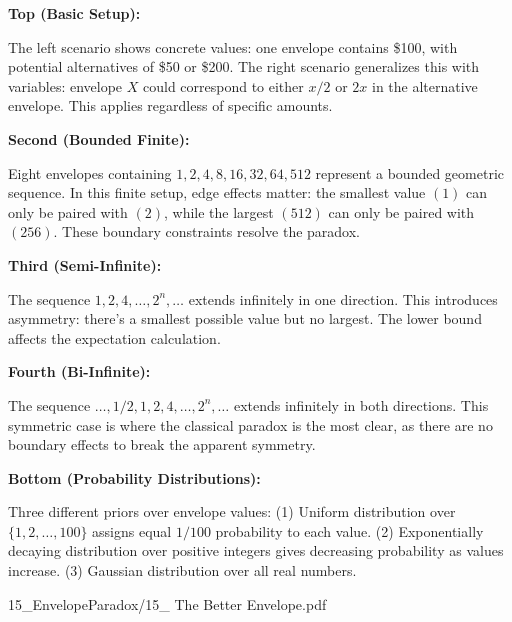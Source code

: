 \begin{SideNotePage}{
  \textbf{Top (Basic Setup):} \par The left scenario shows concrete values: one envelope contains \$100, with potential alternatives of \$50 or \$200. The right scenario generalizes this with variables: envelope $X$ could correspond to either $x/2$ or $2x$ in the alternative envelope. This applies regardless of specific amounts.

  \vspace{1em}
  \textbf{Second (Bounded Finite):} \par Eight envelopes containing $1, 2, 4, 8, 16, 32, 64, 512$ represent a bounded geometric sequence. In this finite setup, edge effects matter: the smallest value $(1)$ can only be paired with $(2)$, while the largest $(512)$ can only be paired with $(256)$. These boundary constraints resolve the paradox.

  \vspace{1em}
  \textbf{Third (Semi-Infinite):} \par The sequence $1, 2, 4, \ldots, 2^n, \ldots$ extends infinitely in one direction. This introduces asymmetry: there's a smallest possible value but no largest. The lower bound affects the expectation calculation.

  \vspace{1em}
  \textbf{Fourth (Bi-Infinite):} \par The sequence $\ldots, 1/2, 1, 2, 4, \ldots, 2^n, \ldots$ extends infinitely in both directions. This symmetric case is where the classical paradox is the most clear, as there are no boundary effects to break the apparent symmetry.

  \vspace{1em}
  \textbf{Bottom (Probability Distributions):} \par Three different priors over envelope values: (1) Uniform distribution over $\{1, 2, \ldots, 100\}$ assigns equal $1/100$ probability to each value. (2) Exponentially decaying distribution over positive integers gives decreasing probability as values increase. (3) Gaussian distribution over all real numbers.
}{15_EnvelopeParadox/15_ The Better Envelope.pdf}
\end{SideNotePage}